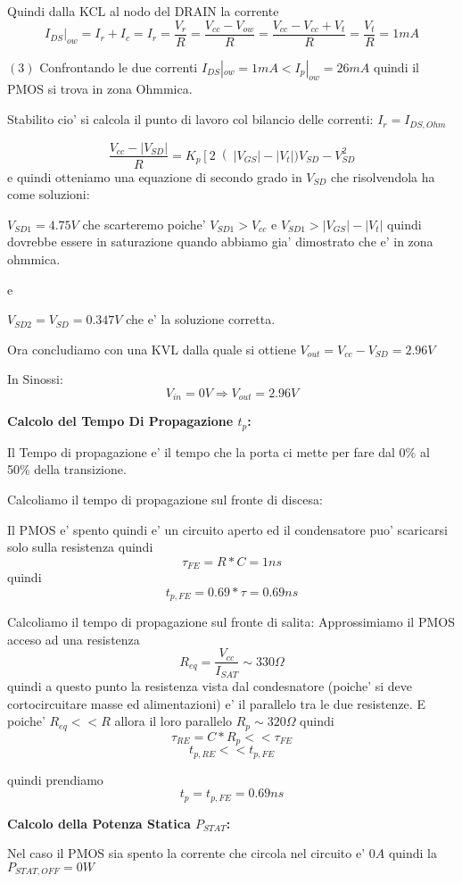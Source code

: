 \documentclass[\main/main.tex]{subfiles}
\begin{document}
Quindi dalla KCL al nodo del DRAIN la corrente \[I_{DS}|_{ow} = I_r + I_c = I_r = \frac{V_r}{R}= \frac{ V_{cc} - V_{ow}}{R} =  \frac{ V_{cc} - V_{cc} + V_t}{R} = \frac{V_t}{R} = 1mA\]

$(3)$ Confrontando le due correnti $I_{DS}|_{ow} = 1mA < I_p |_{ow} = 26mA$ quindi il PMOS si trova in zona Ohmmica.


Stabilito cio' si calcola il punto di lavoro col bilancio delle correnti:
$I_r = I_{DS,Ohm}$

\[\frac{V_{cc} - |V_{SD}|}{R} = K_p \left[ 2 \right(|V_{GS}| - |V_t|)V_{SD} - V_{SD}^2\]
e quindi otteniamo una equazione di secondo grado in $V_{SD}$ che risolvendola ha come soluzioni:

$V_{SD1} = 4.75V$ che scarteremo poiche' $V_{SD1} > V_{cc}$ e $V_{SD1} > |V_{GS}| - |V_t|$ quindi dovrebbe essere in saturazione quando abbiamo gia' dimostrato che e' in zona ohmmica.

e

$V_{SD2} = V_{SD} = 0.347V$ che e' la soluzione corretta.

Ora concludiamo con una KVL dalla quale si ottiene $V_{out} = V_{cc} - V_{SD} = 2.96V$

In Sinossi:
\[V_{in} = 0V \Rightarrow V_{out} = 2.96V\]

\textbf{Calcolo del Tempo Di Propagazione $t_p$:}

Il Tempo di propagazione e' il tempo che la porta ci mette per fare dal 0\% al 50\% della transizione.

Calcoliamo il tempo di propagazione sul fronte di discesa:

Il PMOS e' spento quindi e' un circuito aperto ed il condensatore puo' scaricarsi solo sulla resistenza quindi \[\tau_{FE} = R * C = 1ns\]
quindi \[t_{p,FE} = 0.69 * \tau = 0.69ns\]

Calcoliamo il tempo di propagazione sul fronte di salita:
Approssimiamo il PMOS acceso ad una resistenza
\[R_{eq} = \frac{V_{cc}}{I_{SAT}} \sim 330\Omega\]
quindi a questo punto la resistenza vista dal condesnatore (poiche' si deve cortocircuitare masse ed alimentazioni) e' il parallelo tra le due resistenze.
E poiche' $R_{eq} << R$ allora il loro parallelo $R_p \sim 320\Omega$
quindi \[\tau_{RE} = C * R_p << \tau_{FE}\]
\[t_{p,RE} << t_{p,FE}\]

quindi prendiamo \[t_p = t_{p,FE} = 0.69ns\]

\textbf{Calcolo della Potenza Statica $P_{STAT}$:}

Nel caso il PMOS sia spento la corrente che circola nel circuito e' $0A$ quindi la $P_{STAT,OFF} = 0W$
\end{document}
